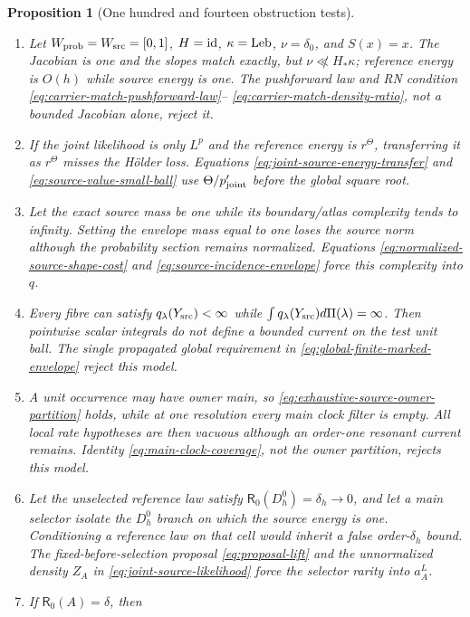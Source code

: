 \documentclass[11pt]{article}
\newtheorem{proposition}[theorem]{Proposition}
\begin{document}
\begin{proposition}[One hundred and fourteen obstruction tests]
\begin{enumerate}[label=\textup{(T\arabic*)}]
\item Let $W_{\rm prob}=W_{\rm src}=[0,1]$, $H={\rm id}$,
      $\kappa={\rm Leb}$, $\nu=\delta_0$, and $S(x)=x$.  The Jacobian is one
      and the slopes match exactly, but
      $\nu\not\ll H_*\kappa$; reference energy is $O(h)$ while source energy
      is one.  The pushforward law and RN condition
      \eqref{eq:carrier-match-pushforward-law}--
      \eqref{eq:carrier-match-density-ratio}, not a bounded Jacobian alone,
      reject it.
\item If the joint likelihood is only $L^p$ and the reference energy is
      $r^\Theta$, transferring it as $r^\Theta$ misses the H\"older loss.
      Equations \eqref{eq:joint-source-energy-transfer} and
      \eqref{eq:source-value-small-ball} use
      $\Theta/p_{\rm joint}'$ before the global square root.
\item Let the exact source mass be one while its boundary/atlas complexity
      tends to infinity.  Setting the envelope mass equal to one loses the
      source norm although the probability section remains normalized.
      Equations \eqref{eq:normalized-source-shape-cost} and
      \eqref{eq:source-incidence-envelope} force this complexity into $q$.
\item Every fibre can satisfy $q_\lambda(Y_{\rm src})<\infty$ while
      $\int q_\lambda(Y_{\rm src})d\Pi(\lambda)=\infty$.  Then pointwise
      scalar integrals do not define a bounded current on the test unit ball.
      The single propagated global requirement in
      \eqref{eq:global-finite-marked-envelope} reject this model.
\item A unit occurrence may have owner main, so
      \eqref{eq:exhaustive-source-owner-partition} holds, while at one
      resolution every main clock filter is empty.  All local rate hypotheses
      are then vacuous although an order-one resonant current remains.
      Identity \eqref{eq:main-clock-coverage}, not the owner partition,
      rejects this model.
\item Let the unselected reference law satisfy
      $\mathsf R_0(D_h^0)=\delta_h\to0$, and let a main selector isolate the
      $D_h^0$ branch on which the source energy is one.  Conditioning a
      reference law on that cell would inherit a false order-$\delta_h$
      bound.  The fixed-before-selection proposal
      \eqref{eq:proposal-lift} and the unnormalized density $Z_A$ in
      \eqref{eq:joint-source-likelihood} force the selector rarity into
      $a_A^L$.
\item If $\mathsf R_0(A)=\delta$, then

\end{enumerate}
\end{proposition}
\end{document}
